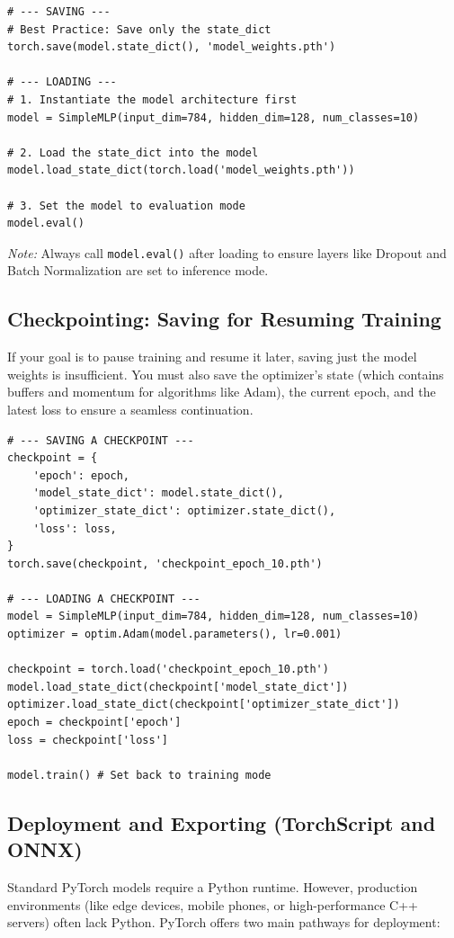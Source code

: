 \documentclass[12pt,a4paper]{report}
\begin{document}
\begin{verbatim}
# --- SAVING ---
# Best Practice: Save only the state_dict
torch.save(model.state_dict(), 'model_weights.pth')

# --- LOADING ---
# 1. Instantiate the model architecture first
model = SimpleMLP(input_dim=784, hidden_dim=128, num_classes=10)

# 2. Load the state_dict into the model
model.load_state_dict(torch.load('model_weights.pth'))

# 3. Set the model to evaluation mode
model.eval()
\end{verbatim}

\textit{Note:} Always call \texttt{model.eval()} after loading to ensure layers like Dropout and Batch Normalization are set to inference mode.

\subsection{Checkpointing: Saving for Resuming Training}
If your goal is to pause training and resume it later, saving just the model weights is insufficient. You must also save the optimizer's state (which contains buffers and momentum for algorithms like Adam), the current epoch, and the latest loss to ensure a seamless continuation.

\begin{verbatim}
# --- SAVING A CHECKPOINT ---
checkpoint = {
    'epoch': epoch,
    'model_state_dict': model.state_dict(),
    'optimizer_state_dict': optimizer.state_dict(),
    'loss': loss,
}
torch.save(checkpoint, 'checkpoint_epoch_10.pth')

# --- LOADING A CHECKPOINT ---
model = SimpleMLP(input_dim=784, hidden_dim=128, num_classes=10)
optimizer = optim.Adam(model.parameters(), lr=0.001)

checkpoint = torch.load('checkpoint_epoch_10.pth')
model.load_state_dict(checkpoint['model_state_dict'])
optimizer.load_state_dict(checkpoint['optimizer_state_dict'])
epoch = checkpoint['epoch']
loss = checkpoint['loss']

model.train() # Set back to training mode
\end{verbatim}

\subsection{Deployment and Exporting (TorchScript and ONNX)}
Standard PyTorch models require a Python runtime. However, production environments (like edge devices, mobile phones, or high-performance C++ servers) often lack Python. PyTorch offers two main pathways for deployment:
\end{document}
